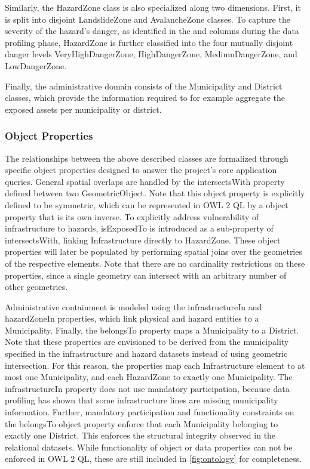 Similarly, the HazardZone class is also specialized along two dimensions. First, it is split into disjoint LandslideZone and AvalancheZone classes. To capture the severity of the hazard's danger, as identified in the  and  columns during the data profiling phase, HazardZone is further classified into the four mutually disjoint danger levels VeryHighDangerZone, HighDangerZone, MediumDangerZone, and LowDangerZone.

Finally, the administrative domain consists of the Municipality and District classes, which provide the information required to for example aggregate the exposed assets per municipality or district.


\subsubsection{Object Properties}

The relationships between the above described classes are formalized through specific object properties designed to answer the project's core application queries. General spatial overlaps are handled by the intersectsWith property defined between two GeometricObject. Note that this object property is explicitly defined to be symmetric, which can be represented in OWL 2 QL by a object property that is its own inverse. To explicitly address vulnerability of infrastructure to hazards, isExposedTo is introduced as a sub-property of intersectsWith, linking Infrastructure directly to HazardZone. These object properties will later be populated by performing spatial joins over the geometries of the respective elements. Note that there are no cardinality restrictions on these properties, since a single geometry can intersect with an arbitrary number of other geometries.

Administrative containment is modeled using the infrastructureIn and hazardZoneIn properties, which link physical and hazard entities to a Municipality. Finally, the belongsTo property maps a Municipality to a District. Note that these properties are envisioned to be derived from the municipality specified in the infrastructure and hazard datasets instead of using geometric intersection. For this reason, the properties map each Infrastructure element to at most one Municipality, and each HazardZone to exactly one Municipality. The infrastructureIn property does not use mandatory participation, because data profiling has shown that some infrastructure lines are missing municipality information. Further, mandatory participation and functionality constraints on the belongsTo object property enforce that each Municipality belonging to exactly one District. This enforces the structural integrity observed in the relational datasets. While functionality of object or data properties can not be enforced in OWL 2 QL, these are still included in \cref{fig:ontology} for completeness.


